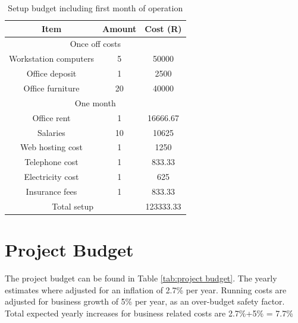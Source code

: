 \documentclass{article}
\begin{document}
\begin{table}[H]
    \centering
    \caption{Setup budget including first month of operation}
    \begin{tabular}{|c|c|c|}
    \hline
      Item&Amount&Cost (R) \\
      \hline
      \multicolumn{3}{|c|}{Once off costs}\\
      \hline
Workstation computers&5&50000 \\
Office deposit&1&2500 \\ 
Office furniture&20&40000 \\
\hline
\multicolumn{3}{|c|}{One month}\\
\hline
Office rent&1&16666.67 \\
Salaries&10&10625 \\
Web hosting cost&1&1250 \\
Telephone cost&1&833.33 \\
Electricity cost&1&625 \\
Insurance fees&1&833.33 \\
\hline
\multicolumn{2}{|c|}{Total  setup}
&123333.33 \\
\hline
\hline

    \end{tabular}
    
    \label{tab:setup_budget}
\end{table}


\section{Project Budget}
The project budget can be found in Table \ref{tab:project budget}. The yearly estimates where adjusted for an inflation of 2.7\% per year. 
Running costs are adjusted for business growth of 5\% per year, as an over-budget safety factor.
Total expected yearly increases for business related costs are 2.7\%+5\% = 7.7\%
\end{document}

